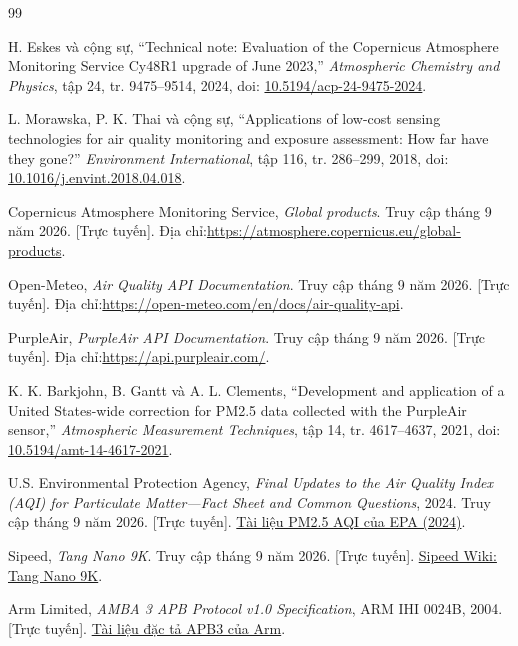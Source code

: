 \documentclass[a4paper,oneside,openany]{extreport}
\begin{document}
\begin{thebibliography}{99}
\setlength{\itemsep}{0pt}

H. Eskes và cộng sự, “Technical note: Evaluation of the Copernicus Atmosphere Monitoring Service Cy48R1 upgrade of June 2023,” \textit{Atmospheric Chemistry and Physics}, tập 24, tr. 9475--9514, 2024, doi: \href{https://doi.org/10.5194/acp-24-9475-2024}{10.5194/acp-24-9475-2024}.

L. Morawska, P. K. Thai và cộng sự, “Applications of low-cost sensing technologies for air quality monitoring and exposure assessment: How far have they gone?” \textit{Environment International}, tập 116, tr. 286--299, 2018, doi: \href{https://doi.org/10.1016/j.envint.2018.04.018}{10.1016/j.envint.2018.04.018}.

Copernicus Atmosphere Monitoring Service, \textit{Global products}. Truy cập tháng 9 năm 2026. [Trực tuyến]. Địa chỉ:\newline\url{https://atmosphere.copernicus.eu/global-products}.

Open-Meteo, \textit{Air Quality API Documentation}. Truy cập tháng 9 năm 2026. [Trực tuyến]. Địa chỉ:\newline\url{https://open-meteo.com/en/docs/air-quality-api}.

PurpleAir, \textit{PurpleAir API Documentation}. Truy cập tháng 9 năm 2026. [Trực tuyến]. Địa chỉ:\newline\url{https://api.purpleair.com/}.

K. K. Barkjohn, B. Gantt và A. L. Clements, “Development and application of a United States-wide correction for PM2.5 data collected with the PurpleAir sensor,” \textit{Atmospheric Measurement Techniques}, tập 14, tr. 4617--4637, 2021, doi: \href{https://doi.org/10.5194/amt-14-4617-2021}{10.5194/amt-14-4617-2021}.

U.S. Environmental Protection Agency, \textit{Final Updates to the Air Quality Index (AQI) for Particulate Matter---Fact Sheet and Common Questions}, 2024. Truy cập tháng 9 năm 2026. [Trực tuyến]. \href{https://www.epa.gov/system/files/documents/2024-02/pm-naaqs-air-quality-index-fact-sheet.pdf}{Tài liệu PM2.5 AQI của EPA (2024)}.

Sipeed, \textit{Tang Nano 9K}. Truy cập tháng 9 năm 2026. [Trực tuyến]. \href{https://en.wiki.sipeed.com/hardware/en/tang/Tang-Nano-9K/Nano-9K.html}{Sipeed Wiki: Tang Nano 9K}.

Arm Limited, \textit{AMBA 3 APB Protocol v1.0 Specification}, ARM IHI 0024B, 2004. [Trực tuyến]. \href{https://documentation-service.arm.com/static/64257d8379edab6d64fb6f68}{Tài liệu đặc tả APB3 của Arm}.

\end{thebibliography}
\end{document}
